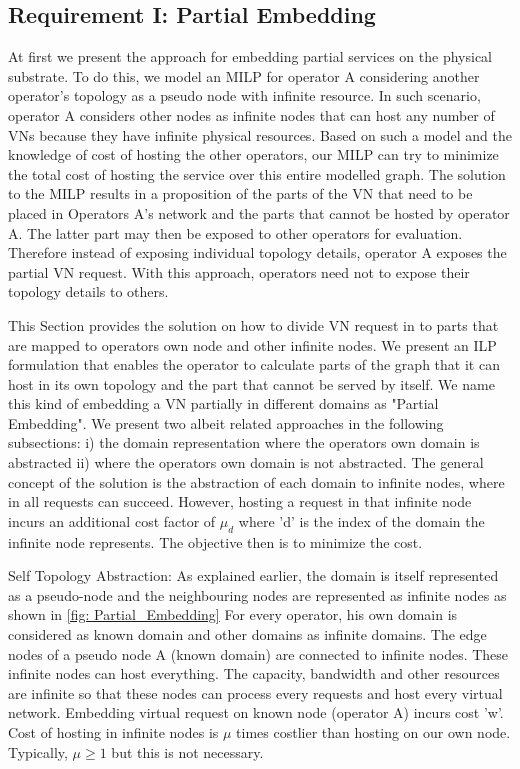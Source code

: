\documentclass[article,dr=phil,type=msc ,colorback,accentcolor=tud4b]{tudthesis}
\begin{document}
\subsection{Requirement I: Partial Embedding}
At first we present the approach for embedding partial services on the physical substrate. To do this, we model an MILP for operator A considering
another operator's topology as a pseudo node with infinite resource. In such scenario, operator A considers other nodes as infinite nodes that can host any number of VNs because they have infinite physical resources. Based on such a model and the knowledge of cost of hosting the other operators, our MILP can try to minimize the total cost of hosting the service over this entire modelled graph. The solution to the MILP results in a proposition of the parts of the VN that need to be placed in Operators A’s network and the parts that cannot be hosted by operator A. The latter part may then be exposed to other operators for evaluation. Therefore instead of exposing individual topology details, operator A exposes the partial VN request. With this approach, operators need not to expose their topology details to others. \newline

This Section provides the solution on how to divide VN request in to parts that are mapped to operators own node and other infinite nodes. We present an ILP formulation that enables the operator to calculate parts of the graph that it can host in its own topology and the part that cannot be served by itself. We name this kind of embedding a VN partially in different domains as "Partial Embedding". We present two albeit related approaches in the following subsections: i) the domain representation where the operators own domain is abstracted ii) where the operators own domain is not abstracted. The
general concept of the solution is the abstraction of each domain to infinite nodes, where in all requests can succeed. However, hosting a request in that infinite node incurs an additional cost factor of $\mu_{d}$ where 'd' is the index of the domain the infinite node represents. The objective then is to minimize the cost. \newline

Self Topology Abstraction: As explained earlier, the domain is itself represented as a pseudo-node and the neighbouring nodes are represented as infinite nodes as shown in \ref{fig: Partial_Embedding} For every operator, his own domain is considered as known domain and other domains as infinite domains. The edge nodes of a pseudo node A (known domain) are connected to infinite nodes. These infinite nodes can host everything. The capacity, bandwidth and other resources are infinite so that these nodes can process every requests and host every virtual network. Embedding virtual request on known node (operator A) incurs cost 'w'. Cost of hosting in infinite nodes is $\mu$ times costlier than hosting on our own node. Typically,  $\mu \geq 1$ but this is not necessary. \newline
\end{document}
